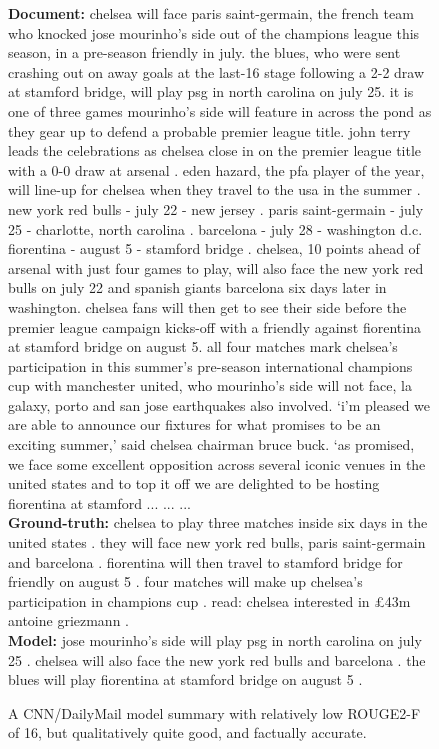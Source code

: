 \begin{figure}[htb!]
\begin{mdframed}
\small
    
    \textbf{Document:} chelsea will face paris saint-germain, the french team who knocked jose mourinho’s side out of the champions league this season, in a pre-season friendly in july. the blues, who were sent crashing out on away goals at the last-16 stage following a 2-2 draw at stamford bridge, will play psg in north carolina on july 25. it is one of three games mourinho’s side will feature in across the pond as they gear up to defend a probable premier league title. john terry leads the celebrations as chelsea close in on the premier league title with a 0-0 draw at arsenal . eden hazard, the pfa player of the year, will line-up for chelsea when they travel to the usa in the summer . new york red bulls - july 22 - new jersey . paris saint-germain - july 25 - charlotte, north carolina . barcelona - july 28 - washington d.c. fiorentina - august 5 - stamford bridge . chelsea, 10 points ahead of arsenal with just four games to play, will also face the new york red bulls on july 22 and spanish giants barcelona six days later in washington. chelsea fans will then get to see their side before the premier league campaign kicks-off with a friendly against fiorentina at stamford bridge on august 5. all four matches mark chelsea’s participation in this summer’s pre-season international champions cup with manchester united, who mourinho’s side will not face, la galaxy, porto and san jose earthquakes also involved. ‘i’m pleased we are able to announce our fixtures for what promises to be an exciting summer,' said chelsea chairman bruce buck. ‘as promised, we face some excellent opposition across several iconic venues in the united states and to top it off we are delighted to be hosting fiorentina at stamford ... ... ...  \\
    
    \textbf{Ground-truth:}
    chelsea to play three matches inside six days in the united states . they will face new york red bulls, paris saint-germain and barcelona . fiorentina will then travel to stamford bridge for friendly on august 5 . four matches will make up chelsea's participation in champions cup . read: chelsea interested in £43m antoine griezmann .
    \\ 
    
    \textbf{Model:}  
    jose mourinho's side will play psg in north carolina on july 25 . chelsea will also face the new york red bulls and barcelona . the blues will play fiorentina at stamford bridge on august 5 .
    
\normalsize
\end{mdframed}

  
\caption{A CNN/DailyMail \pegasuslarge model summary with relatively low
ROUGE2-F of 16, but qualitatively quite good, and factually accurate.
}

\label{fig:qualitative_cnn_example}

\end{figure}